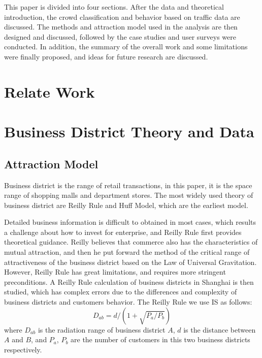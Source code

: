 \documentclass[journal,transmag]{IEEEtran}
\begin{document}
This paper is divided into four sections. After the data and theoretical introduction, the crowd classification and behavior based on traffic data are discussed. The methods and attraction model used in the analysis are then designed and discussed, followed by the case studies and user surveys were conducted. In addition, the summary of the overall work and some limitations were finally proposed, and ideas for future research are discussed.


\section{Relate Work}







\section{Business District Theory and Data}

\subsection{Attraction Model}

Business district is the range of retail transactions, in this paper, it is the space range of shopping malls and department stores. The most widely used theory of business district are Reilly Rule and Huff Model, which are the earliest model. 

Detailed business information is difficult to obtained in most cases, which results a challenge about how to invest for enterprise, and Reilly Rule first provides theoretical guidance. Reilly believes that commerce also has the characteristics of mutual attraction, and then he put forward the method of the critical range of attractiveness of the business district based on the Law of Universal Gravitation. However, Reilly Rule has great limitations, and requires more stringent preconditions. A Reilly Rule calculation of business districts in Shanghai is then studied, which has complex errors due to the differences and complexity of business districts and customers behavior. The Reilly Rule we use IS as follows:
\begin{equation}
D_{ab}=d/(1+\sqrt{P_{a}/P_{b}})
\end{equation}
where $D_{ab}$ is the radiation range of business district $A$, $d$ is the distance between $A$ and $B$, and $P_{a}$, $P_{b}$ are the number of customers in this two business districts respectively.
\end{document}
